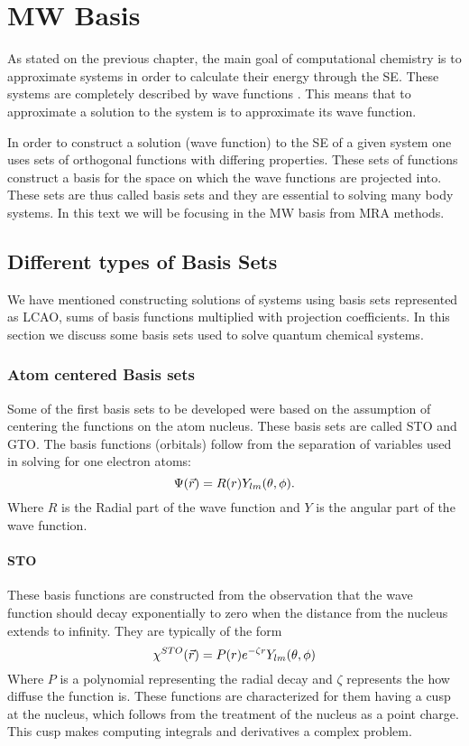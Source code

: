 \documentclass[../master_thesis.tex]{subfiles}
\begin{document}
\chapter{\ac{MW} Basis}
As stated on the previous chapter, the main goal of computational chemistry is
to approximate systems in order to calculate their energy through the \ac{SE}. %
These systems are completely described by wave functions \cite{Cohen:1973}.
This means that to approximate a solution to the system is to approximate its
wave function.

In order to construct a solution (wave function) to the \ac{SE} of a given
system one uses sets of orthogonal functions with differing properties. These
sets of functions construct a basis for the space on which the wave functions
are projected into. These sets are thus called basis sets \cite{Cramer:2004}
and they are essential to solving many body systems. In this text we will be
focusing in the \ac{MW} basis from \ac{MRA} methods.
\section{Different types of  Basis Sets}
We have mentioned constructing solutions of systems using basis sets represented as
\ac{LCAO}, sums of basis functions multiplied with projection coefficients.
In this section we discuss some basis sets used to solve quantum chemical systems.
\subsection{Atom centered Basis sets}
Some of the first basis sets to be developed were based on the assumption of
centering the functions on the atom nucleus. These basis sets are called \ac{STO}
and \ac{GTO}. The basis functions (orbitals) follow from the separation of variables
used in solving for one electron atoms:
\begin{equation}
  \Psi(\vec{r}) = R(r)Y_{lm}(\theta, \phi).
\end{equation}
Where $R$ is the Radial part of the wave function and $Y$ is the angular part of
the wave function.
\subsubsection{\ac{STO}}
These basis functions are constructed from the observation that the wave function
should decay exponentially to zero when the distance from the nucleus extends
to infinity. They are typically of the form \cite{Jensen:2017, ESQCB1P1}
\begin{equation}
  \chi^{STO}(\vec{r}) = P(r)e^{-\zeta r}Y_{lm}(\theta, \phi)
\end{equation}
Where $P$ is a polynomial representing the radial decay and $\zeta$ represents the
how diffuse the function is. These functions are characterized for them having a cusp
at the nucleus, which follows from the treatment of the nucleus as a point charge.
This cusp makes computing integrals and derivatives a complex problem.
\end{document}
